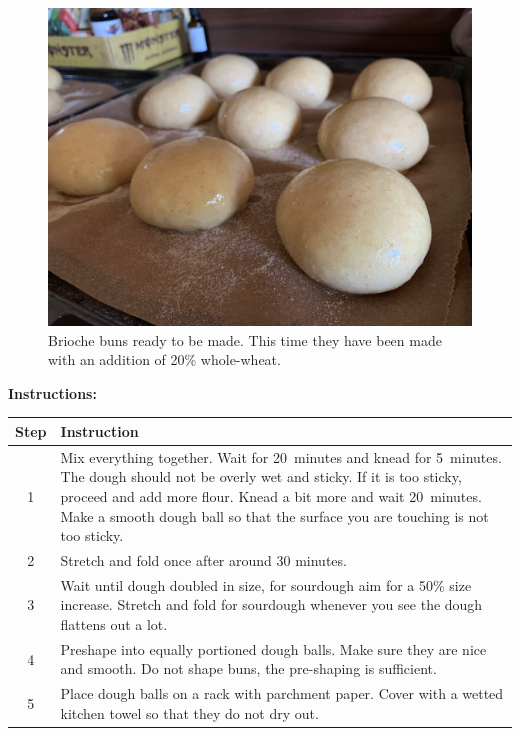 \begin{figure}[h]
    \centering
    \includegraphics[width=\textwidth]{brioche-buns-before-baking}
    \caption{Brioche buns ready to be made. This time they have been made with
    an addition of 20\% whole-wheat.}
\end{figure}

\noindent\textbf{Instructions:}
\begin{center}
\begin{tabular}{|c|p{12cm}|}
    \hline
    \textbf{Step} & \textbf{Instruction} \\
    \hline
    1 & Mix everything together. Wait for 20~minutes and knead for 5~minutes.
    The dough should not be overly wet and sticky. If it is too sticky, proceed
    and add more flour. Knead a bit more and wait 20~minutes. Make a smooth
    dough ball so that the surface you are touching is not too sticky. \\
    \hline
    2 & Stretch and fold once after around 30 minutes. \\
    \hline
    3 & Wait until dough doubled in size, for sourdough aim for a 50\% size
    increase. Stretch and fold for sourdough whenever you see the dough
    flattens out a lot. \\
    \hline
    4 & Preshape into equally portioned dough balls. Make sure they are nice
    and smooth. Do not shape buns, the pre-shaping is sufficient. \\
    \hline
    5 & Place dough balls on a rack with parchment paper. Cover with a wetted
    kitchen towel so that they do not dry out. \\
    \hline
\end{tabular}
\end{center}

